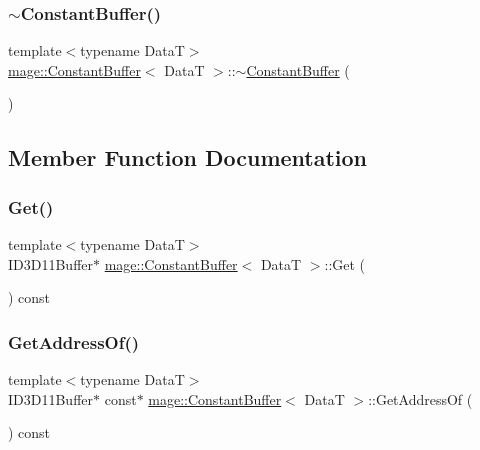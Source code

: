 \subsubsection{\texorpdfstring{$\sim$\+Constant\+Buffer()}{~ConstantBuffer()}}
{\footnotesize\ttfamily template$<$typename DataT$>$ \\
\hyperlink{structmage_1_1_constant_buffer}{mage\+::\+Constant\+Buffer}$<$ DataT $>$\+::$\sim$\hyperlink{structmage_1_1_constant_buffer}{Constant\+Buffer} (\begin{DoxyParamCaption}{ }\end{DoxyParamCaption})\hspace{0.3cm}{\ttfamily [default]}}



\subsection{Member Function Documentation}
\hypertarget{structmage_1_1_constant_buffer_ab8f6a3a3e1f4e009b6ab2aa2b9569030}{}\label{structmage_1_1_constant_buffer_ab8f6a3a3e1f4e009b6ab2aa2b9569030} 
\subsubsection{\texorpdfstring{Get()}{Get()}}
{\footnotesize\ttfamily template$<$typename DataT$>$ \\
I\+D3\+D11\+Buffer$\ast$ \hyperlink{structmage_1_1_constant_buffer}{mage\+::\+Constant\+Buffer}$<$ DataT $>$\+::Get (\begin{DoxyParamCaption}{ }\end{DoxyParamCaption}) const}

\hypertarget{structmage_1_1_constant_buffer_ad0bfc8d52f2e6442a9612052527b16ea}{}\label{structmage_1_1_constant_buffer_ad0bfc8d52f2e6442a9612052527b16ea} 
\subsubsection{\texorpdfstring{Get\+Address\+Of()}{GetAddressOf()}\hspace{0.1cm}{\footnotesize\ttfamily [1/2]}}
{\footnotesize\ttfamily template$<$typename DataT$>$ \\
I\+D3\+D11\+Buffer$\ast$ const$\ast$ \hyperlink{structmage_1_1_constant_buffer}{mage\+::\+Constant\+Buffer}$<$ DataT $>$\+::Get\+Address\+Of (\begin{DoxyParamCaption}{ }\end{DoxyParamCaption}) const}

